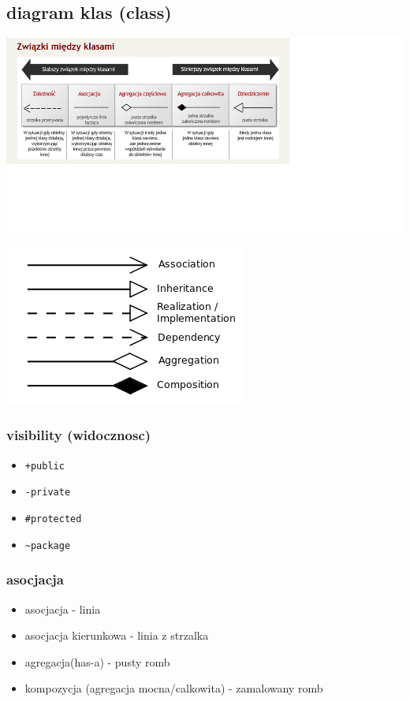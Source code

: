 \documentclass[11pt]{article}
\begin{document}
\subsection{diagram klas (class)}
\label{sec:org1740a3b}
\begin{center}
\includegraphics[width=.9\linewidth]{./zwiazki_UML.png}
\end{center}
\begin{center}
\includegraphics[width=.9\linewidth]{./uml.png}
\end{center}
\subsubsection{visibility (widocznosc)}
\label{sec:orgd79f67e}
\begin{itemize}
\item \texttt{+public}
\item \texttt{-private}
\item \texttt{\#protected}
\item \texttt{\textasciitilde{}package}
\end{itemize}
\subsubsection{asocjacja}
\label{sec:org3a87cb1}
\begin{itemize}
\item asocjacja - linia
\item asocjacja kierunkowa - linia z strzalka
\item agregacja(has-a) - pusty romb
\item kompozycja (agregacja mocna/calkowita) - zamalowany romb
\end{itemize}
\end{document}
